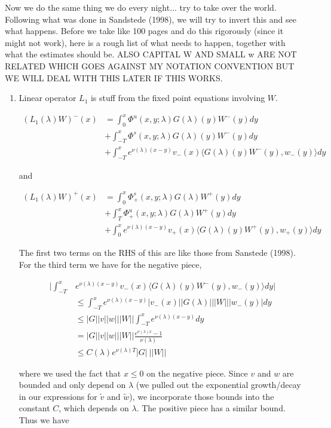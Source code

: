 \documentclass[12pt]{article}
\begin{document}
Now we do the same thing we do every night... try to take over the world. Following what was done in Sandstede (1998), we will try to invert this and see what happens. Before we take like 100 pages and do this rigorously (since it might not work), here is a rough list of what needs to happen, together with what the estimates should be. ALSO CAPITAL W AND SMALL w ARE NOT RELATED WHICH GOES AGAINST MY NOTATION CONVENTION BUT WE WILL DEAL WITH THIS LATER IF THIS WORKS.

\begin{enumerate}

\item Linear operator $L_1$ is stuff from the fixed point equations involving $W$.

\begin{align*}
(L_1(\lambda)W)^-(x) &= \int_0^x \Phi^u(x, y; \lambda) G(\lambda)(y)W^-(y) dy \\
&+ \int_{-T}^x \Phi^s(x, y; \lambda) G(\lambda)(y)W^-(y) dy \\
&+ \int_{-T}^x 
e^{\nu(\lambda)(x-y)} v_-(x) \langle G(\lambda)(y)W^-(y), w_-(y) \rangle dy 
\end{align*}

and

\begin{align*}
(L_1(\lambda)W)^+(x) &= \int_0^x \Phi^s_+(x, y; \lambda) G(\lambda)W^+(y) dy \\
&+ \int_T^x \Phi^u_+(x, y; \lambda) G(\lambda)W^+(y) dy \\
&+ \int_0^x e^{\nu(\lambda)(x-y)} v_+(x) \langle G(\lambda)(y)W^+(y), w_+(y) \rangle dy
\end{align*}

The first two terms on the RHS of this are like those from Sanstede (1998). For the third term we have for the negative piece,

\begin{align*}
\Big| \int_{-T}^x &e^{\nu(\lambda)(x-y)} v_-(x) \langle G(\lambda)(y)W^-(y), w_-(y) \rangle dy \Big| \\
&\leq \int_{-T}^x e^{\nu(\lambda)(x-y)} |v_-(x)| |G(\lambda)|||W|||w_-(y)|dy \\
&\leq |G||v||w|||W|| \int_{-T}^x e^{\nu(\lambda)(x-y)} dy \\
&= |G||v||w|||W|| \frac{e^{\nu(\lambda)x} - 1}{\nu(\lambda)} \\
&\leq C(\lambda) e^{\nu(\lambda)T} |G| \: ||W||
\end{align*}

where we used the fact that $x \leq 0$ on the negative piece. Since $v$ and $w$ are bounded and only depend on $\lambda$ (we pulled out the exponential growth/decay in our expressions for $\tilde{v}$ and $\tilde{w}$), we incorporate those bounds into the constant $C$, which depends on $\lambda$. The positive piece has a similar bound. Thus we have


\end{enumerate}
\end{document}
